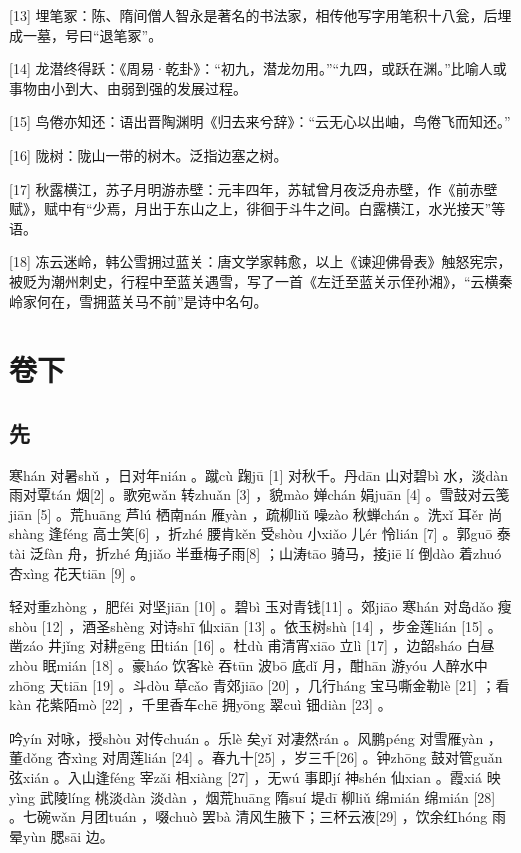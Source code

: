 \documentclass[12pt,UTF8]{ctexbook}
\begin{document}
[13] 埋笔冢：陈、隋间僧人智永是著名的书法家，相传他写字用笔积十八瓮，后埋成一墓，号曰“退笔冢”。

[14] 龙潜终得跃：《周易·乾卦》：“初九，潜龙勿用。”“九四，或跃在渊。”比喻人或事物由小到大、由弱到强的发展过程。

[15] 鸟倦亦知还：语出晋陶渊明《归去来兮辞》：“云无心以出岫，鸟倦飞而知还。”

[16] 陇树：陇山一带的树木。泛指边塞之树。

[17] 秋露横江，苏子月明游赤壁：元丰四年，苏轼曾月夜泛舟赤壁，作《前赤壁赋》，赋中有“少焉，月出于东山之上，徘徊于斗牛之间。白露横江，水光接天”等语。

[18] 冻云迷岭，韩公雪拥过蓝关：唐文学家韩愈，以上《谏迎佛骨表》触怒宪宗，被贬为潮州刺史，行程中至蓝关遇雪，写了一首《左迁至蓝关示侄孙湘》，“云横秦岭家何在，雪拥蓝关马不前”是诗中名句。





\part{卷下}

\setcounter{chapter}{0}

\chapter{先}


寒hán 对暑shǔ ，日对年nián 。蹴cù 踘jū [1] 对秋千。丹dān 山对碧bì 水，淡dàn 雨对覃tán 烟[2] 。歌宛wǎn 转zhuǎn [3] ，貌mào 婵chán 娟juān [4] 。雪鼓对云笺jiān [5] 。荒huāng 芦lú 栖南nán 雁yàn ，疏柳liǔ 噪zào 秋蝉chán 。洗xǐ 耳ěr 尚shàng 逢féng 高士笑[6] ，折zhé 腰肯kěn 受shòu 小xiǎo 儿ér 怜lián [7] 。郭guō 泰tài 泛fàn 舟，折zhé 角jiǎo 半垂梅子雨[8] ；山涛tāo 骑马，接jiē lí 倒dào 着zhuó 杏xìng 花天tiān [9] 。

轻对重zhòng ，肥féi 对坚jiān [10] 。碧bì 玉对青钱[11] 。郊jiāo 寒hán 对岛dǎo 瘦shòu [12] ，酒圣shèng 对诗shī 仙xiān [13] 。依玉树shù [14] ，步金莲lián [15] 。凿záo 井jǐng 对耕gēng 田tián [16] 。杜dù 甫清宵xiāo 立lì [17] ，边韶sháo 白昼zhòu 眠mián [18] 。豪háo 饮客kè 吞tūn 波bō 底dǐ 月，酣hān 游yóu 人醉水中zhōng 天tiān [19] 。斗dòu 草cǎo 青郊jiāo [20] ，几行háng 宝马嘶金勒lè [21] ；看kàn 花紫陌mò [22] ，千里香车chē 拥yōng 翠cuì 钿diàn [23] 。

吟yín 对咏，授shòu 对传chuán 。乐lè 矣yǐ 对凄然rán 。风鹏péng 对雪雁yàn ，董dǒng 杏xìng 对周莲lián [24] 。春九十[25] ，岁三千[26] 。钟zhōng 鼓对管guǎn 弦xián 。入山逢féng 宰zǎi 相xiàng [27] ，无wú 事即jí 神shén 仙xian 。霞xiá 映yìng 武陵líng 桃淡dàn 淡dàn ，烟荒huāng 隋suí 堤dī 柳liǔ 绵mián 绵mián [28] 。七碗wǎn 月团tuán ，啜chuò 罢bà 清风生腋下；三杯云液[29] ，饮余红hóng 雨晕yùn 腮sāi 边。
\end{document}

